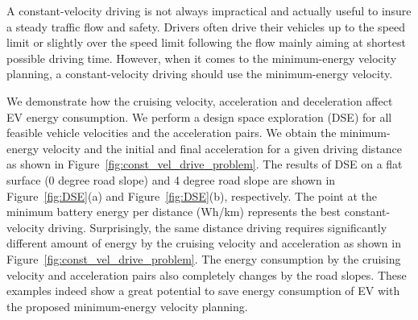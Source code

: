 \documentclass{IEEEtran}
\begin{document}
A constant-velocity driving is not always impractical and actually  useful to insure a steady  traffic flow and safety. Drivers often drive their vehicles up to the speed limit or slightly over the speed limit following the flow mainly aiming at shortest possible driving time. However, when it comes to the minimum-energy velocity planning, a constant-velocity driving should use the minimum-energy velocity. 

We demonstrate how the cruising velocity, acceleration and deceleration affect EV energy consumption. We perform a design space exploration (DSE) for all feasible vehicle velocities and the acceleration pairs. We obtain the minimum-energy velocity and the initial and final acceleration for a given driving distance  as shown in Figure~\ref{fig:const_vel_drive_problem}. The results of DSE on a flat surface (0 degree road slope) and 4 degree road slope are shown in Figure~\ref{fig:DSE}(a) and Figure~\ref{fig:DSE}(b), respectively. The point at the minimum battery energy per distance (Wh/km) represents the best constant-velocity driving. Surprisingly, the same distance driving requires significantly different amount of energy by the cruising velocity and acceleration as shown in Figure~\ref{fig:const_vel_drive_problem}. The energy consumption by the cruising velocity and acceleration pairs also completely changes by the road slopes. These examples indeed show a great potential to save energy consumption of EV with the proposed minimum-energy velocity planning.
\end{document}
